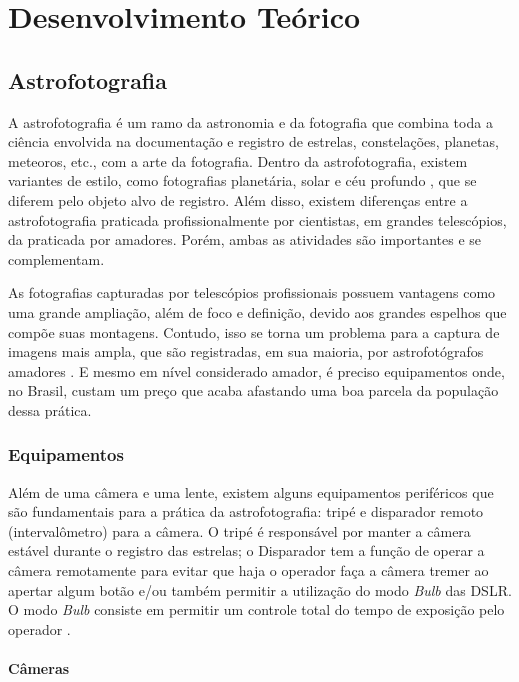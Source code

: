 \chapter{Desenvolvimento Teórico}

\section{Astrofotografia}

A astrofotografia é um ramo da astronomia e da fotografia que combina toda a ciência envolvida na documentação e registro de estrelas, constelações, planetas, meteoros, etc., com a arte da fotografia. Dentro da astrofotografia, existem variantes de estilo, como fotografias planetária, solar e céu profundo \cite{livro:astropratica}, que se diferem pelo objeto alvo de registro. Além disso, existem diferenças entre a astrofotografia praticada profissionalmente por cientistas, em grandes telescópios, da praticada por amadores. Porém, ambas as atividades são importantes e se complementam.

As fotografias capturadas por telescópios profissionais possuem vantagens como uma grande ampliação, além de foco e definição, devido aos grandes espelhos que compõe suas montagens. Contudo, isso se torna um problema para a captura de imagens mais ampla, que são registradas, em sua maioria, por astrofotógrafos amadores \cite{livro:astropratica}. E mesmo em nível considerado amador, é preciso equipamentos onde, no Brasil, custam um preço que acaba afastando uma boa parcela da população dessa prática.

\subsection{Equipamentos}

Além de uma câmera e uma lente, existem alguns equipamentos periféricos que são fundamentais para a prática da astrofotografia: tripé e disparador remoto (intervalômetro) para a câmera. O tripé é responsável por manter a câmera estável durante o registro das estrelas; o Disparador tem a função de operar a câmera remotamente para evitar que haja o operador faça a câmera tremer ao apertar algum botão e/ou também permitir a utilização do modo \textit{Bulb} das DSLR. O modo \textit{Bulb} consiste em permitir um controle total do tempo de exposição pelo operador \cite{book:bbcsky}.

\subsubsection{Câmeras}

